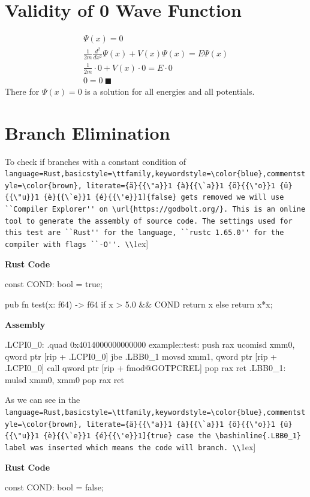 \documentclass[11pt,DIV=10,final]{scrreprt} %
\providecommand{\rustinline}{\lstinline[language=Rust,basicstyle=\ttfamily,keywordstyle=\color{blue},commentstyle=\color{brown}, literate={ä}{{\"a}}1 {à}{{\`a}}1 {ö}{{\"o}}1 {ü}{{\"u}}1 {è}{{\`e}}1 {é}{{\'e}}1]} % für Inline-C++ Code
\providecommand{\bashinline}{\lstinline[language=bash,basicstyle=\ttfamily,keywordstyle=\color{blue},commentstyle=\color{brown}, literate={ä}{{\"a}}1 {à}{{\`a}}1 {ö}{{\"o}}1 {ü}{{\"u}}1 {è}{{\`e}}1 {é}{{\'e}}1]} % für Inline-C++ Code
\begin{document}
{\begin{appendix}
\section{Validity of 0 Wave Function}\label{proof:zero-wave-function}
\begin{align}
  \Psi(x) = 0 \\
  \frac{1}{2m} \frac{d^{2}}{dx^{2}}\Psi(x) + V(x) \Psi(x)  = E \Psi(x) \\
  \frac{1}{2m} \cdot 0 + V(x) \cdot 0 = E \cdot 0 \\
  0 = 0~\blacksquare
\end{align}
There for $\Psi(x) = 0$ is a solution for all energies and all potentials.
\section{Branch Elimination}\label{test:branch-elim}
To check if branches with a constant condition of \rustinline{false} gets removed we will use ``Compiler Explorer'' on \url{https://godbolt.org/}.
This is an online tool to generate the assembly of source code.
The settings used for this test are ``Rust'' for the language, ``rustc 1.65.0'' for the compiler with flags ``-O''.
\\[1ex]
\begin{paracol}{2}
{\noindent \bfseries Rust Code}
\begin{rustcode}[numbers=none]
const COND: bool = true;

pub fn test(x: f64) -> f64 {
    if x > 5.0 && COND {
        return x %
    } else {
        return x*x;
    }
}
\end{rustcode}
\switchcolumn
{\noindent \bfseries Assembly}
\begin{bashcode}[numbers=none]
.LCPI0_0:
        .quad   0x4014000000000000
example::test:
        push    rax
        ucomisd xmm0, qword ptr [rip + .LCPI0_0]
        jbe     .LBB0_1
        movsd   xmm1, qword ptr [rip + .LCPI0_0]
        call    qword ptr [rip + fmod@GOTPCREL]
        pop     rax
        ret
.LBB0_1:
        mulsd   xmm0, xmm0
        pop     rax
        ret
\end{bashcode}
\end{paracol}
As we can see in the \rustinline{true} case the \bashinline{.LBB0_1} label was inserted which means the code will branch.
\\[1ex]
\begin{paracol}{2}
{\noindent \bfseries Rust Code}
\begin{rustcode}[numbers=none]
const COND: bool = false;


\end{rustcode}
\end{paracol}
\end{appendix}}
\end{document}
